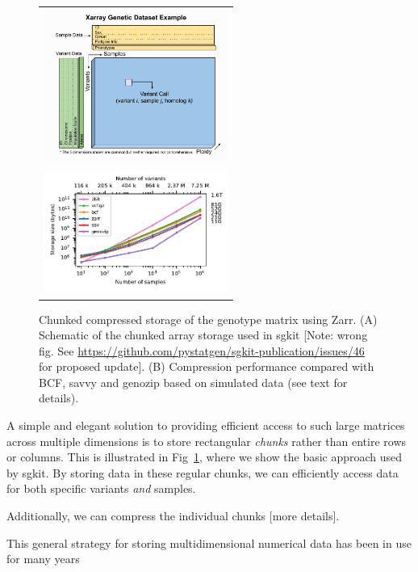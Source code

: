 \documentclass[a4paper,num-refs]{oup-contemporary}
\begin{document}
\begin{figure}
\begin{tabular}{c}
\includegraphics[width=6cm]{diagrams/sgkit_xarray_diagram.pdf} \\
\includegraphics[width=6cm]{figures/data-scaling}
\end{tabular}
\caption{Chunked compressed storage of the genotype matrix using Zarr.
(A) Schematic of the chunked array storage used in sgkit
[Note: wrong fig. See
\url{https://github.com/pystatgen/sgkit-publication/issues/46} for
proposed update].
(B) Compression performance compared with BCF, savvy and genozip
based on simulated data (see text for details).
\label{fig-data-storage}}
\end{figure}

A simple and elegant solution to providing efficient access to such
large matrices across multiple dimensions is to store rectangular
\emph{chunks} rather than entire rows or columns. This is illustrated
in Fig~\ref{fig-data-storage}, where we show the basic approach
used by sgkit. By storing data in these regular chunks, we
can efficiently access data for both specific variants \emph{and}
samples.

Additionally, we can compress the individual chunks [more details].

This general strategy for storing multidimensional numerical data
has been in use for many years~\citep{folk2011overview}
\end{document}

